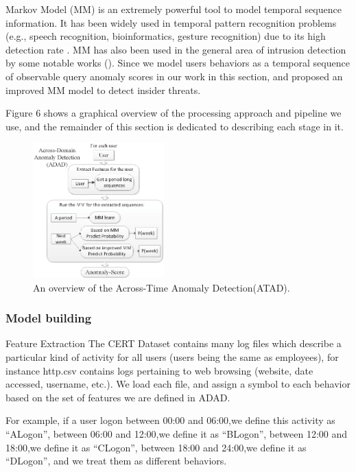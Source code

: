 \documentclass[conference]{IEEEtran}
\begin{document}
Markov Model (MM)\cite{b45} is an extremely powerful
tool to model temporal sequence information. It has been
widely used in temporal pattern recognition problems (e.g.,
speech recognition, bioinformatics, gesture recognition) due
to its high detection rate \cite{b55}. MM has also been used
in the general area of intrusion detection by some notable
works (\cite{b54}). Since we model users behaviors as a
temporal sequence of observable query anomaly scores in
our work in this section, and proposed an improved MM model to detect insider threats.

Figure 6 shows a graphical overview of the processing approach and pipeline we use, and the remainder of this section is dedicated to describing each stage in it.
\begin{figure}[htb]
\centerline{\includegraphics[width = 0.45\textwidth]{figure/figure6.eps}}
\caption{An overview of the Across-Time Anomaly Detection(ATAD).}
\label{fig}
\end{figure}
\subsubsection{Model building}
\iffalse
Feature Extraction
The CERT Dataset contains many log files which describe a particular kind of activity for all users (users being the same as employees), for instance http.csv contains logs pertaining to web browsing (website, date accessed, username, etc.). We load each file, and assign a symbol to each behavior based on the set of features we are defined in ADAD. 

For example, if a user logon between 00:00 and 06:00,we define this activity as “ALogon”, between 06:00 and 12:00,we define it as “BLogon”, between 12:00 and 18:00,we define it as “CLogon”, between 18:00 and 24:00,we define it as “DLogon”, and we treat them as different behaviors. 
\end{document}
